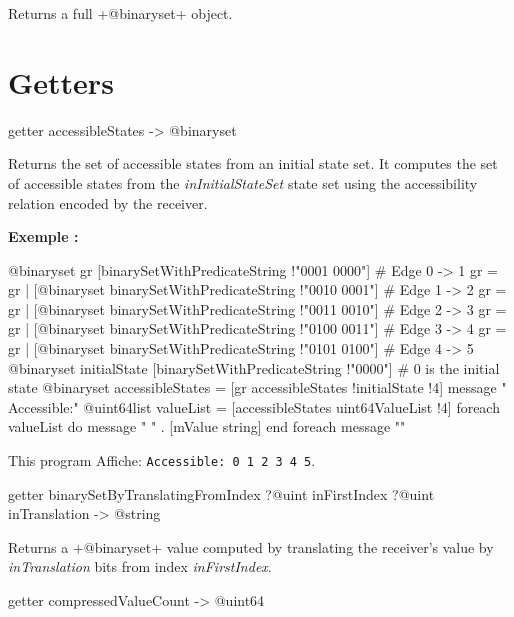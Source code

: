 Returns a full \ggs+@binaryset+ object.


\section{Getters}




\begin{galgasbox}
getter accessibleStates -> @binaryset
\end{galgasbox}

Returns the set of accessible states from an initial state set. It computes the set of accessible states from the \emph{inInitialStateSet} state set using the accessibility relation encoded by the receiver.

\textbf{Exemple :}
\begin{galgas}
@binaryset gr [binarySetWithPredicateString !"0001 0000"] # Edge 0 -> 1
gr = gr | [@binaryset binarySetWithPredicateString !"0010 0001"] # Edge 1 -> 2
gr = gr | [@binaryset binarySetWithPredicateString !"0011 0010"] # Edge 2 -> 3
gr = gr | [@binaryset binarySetWithPredicateString !"0100 0011"] # Edge 3 -> 4
gr = gr | [@binaryset binarySetWithPredicateString !"0101 0100"] # Edge 4 -> 5
@binaryset initialState [binarySetWithPredicateString !"0000"] # 0 is the initial state
@binaryset accessibleStates = [gr accessibleStates !initialState !4]
message " Accessible:"
@uint64list valueList = [accessibleStates uint64ValueList !4]
foreach valueList do
  message " " . [mValue string]
end foreach
message "\n"
\end{galgas}


This program Affiche: \texttt{Accessible: 0 1 2 3 4 5}.




\begin{galgasbox}
getter binarySetByTranslatingFromIndex ?@uint inFirstIndex ?@uint inTranslation -> @string
\end{galgasbox}


Returns a \ggs+@binaryset+ value computed by translating the receiver's value by \emph{inTranslation} bits from index \emph{inFirstIndex}.




\begin{galgasbox}
getter compressedValueCount -> @uint64
\end{galgasbox}


